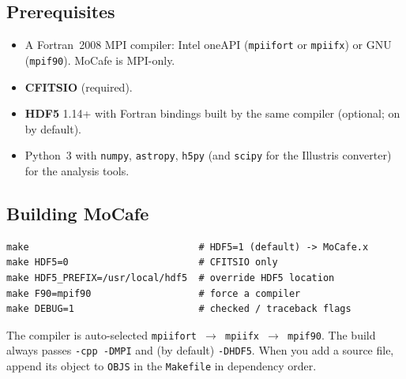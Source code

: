 \documentclass[english,a4paper]{kiseon_memo}
\newcommand{\code}[1]{\texttt{#1}}
\newcommand{\file}[1]{\texttt{#1}}
\begin{document}
\subsection{Prerequisites}
\begin{itemize}
\item A Fortran~2008 MPI compiler: Intel oneAPI (\code{mpiifort} or
      \code{mpiifx}) or GNU (\code{mpif90}).  MoCafe is MPI-only.
\item \textbf{CFITSIO} (required).
\item \textbf{HDF5} 1.14+ with Fortran bindings built by the same compiler
      (optional; on by default).
\item Python~3 with \code{numpy}, \code{astropy}, \code{h5py}
      (and \code{scipy} for the Illustris converter) for the analysis tools.
\end{itemize}

\subsection{Building MoCafe}
\begin{lstlisting}[style=sh]
make                              # HDF5=1 (default) -> MoCafe.x
make HDF5=0                       # CFITSIO only
make HDF5_PREFIX=/usr/local/hdf5  # override HDF5 location
make F90=mpif90                   # force a compiler
make DEBUG=1                      # checked / traceback flags
\end{lstlisting}
The compiler is auto-selected \code{mpiifort $\to$ mpiifx $\to$ mpif90}.  The
build always passes \code{-cpp -DMPI} and (by default) \code{-DHDF5}.  When you
add a source file, append its object to \code{OBJS} in the \file{Makefile} in
dependency order.
\end{document}
